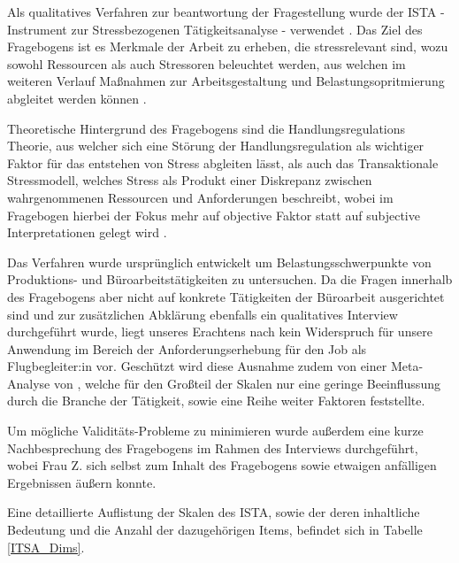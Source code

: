 \documentclass[12pt, a4paper]{article}
\begin{document}
Als qualitatives Verfahren zur beantwortung der Fragestellung wurde der ISTA - Instrument zur Stressbezogenen Tätigkeitsanalyse - verwendet 
\parencite{semmerISTAInstrumentZur1998}. 
Das Ziel des Fragebogens ist es Merkmale der Arbeit zu erheben, die stressrelevant sind,
wozu sowohl Ressourcen als auch Stressoren beleuchtet werden, aus welchen im weiteren Verlauf 
Maßnahmen zur Arbeitsgestaltung und Belastungsopritmierung abgleitet werden können \parencite{semmerInstrumentZurStressbezogenen1999}. 

Theoretische Hintergrund des Fragebogens sind die Handlungsregulations Theorie, aus welcher sich eine Störung der Handlungsregulation
als wichtiger Faktor für das entstehen von Stress abgleiten lässt, als auch das Transaktionale Stressmodell, 
welches Stress als Produkt einer Diskrepanz zwischen wahrgenommenen Ressourcen und Anforderungen beschreibt, 
wobei im Fragebogen hierbei der Fokus mehr auf objective Faktor statt auf subjective Interpretationen gelegt wird 
\parencite{semmerInstrumentZurStressbezogenen1999}.

Das Verfahren wurde ursprünglich entwickelt um Belastungsschwerpunkte von Produktions- und Büroarbeitstätigkeiten zu untersuchen. 
Da die Fragen innerhalb des Fragebogens aber nicht auf konkrete Tätigkeiten der Büroarbeit
ausgerichtet sind und zur zusätzlichen Abklärung ebenfalls ein qualitatives Interview durchgeführt wurde, 
liegt unseres Erachtens nach kein Widerspruch für unsere Anwendung im
Bereich der Anforderungserhebung für den Job als Flugbegleiter:in vor. 
Geschützt wird diese Ausnahme zudem von einer Meta-Analyse von \textcite{irmerInstrumentStressOrientedTask2019}, welche für den Großteil der 
Skalen nur eine geringe Beeinflussung durch die Branche der Tätigkeit, sowie eine Reihe weiter Faktoren feststellte.
 
Um mögliche Validitäts-Probleme zu minimieren wurde außerdem eine kurze Nachbesprechung des Fragebogens im Rahmen des Interviews durchgeführt, 
wobei Frau Z. sich selbst zum Inhalt des Fragebogens sowie etwaigen anfälligen Ergebnissen äußern konnte. 

Eine detaillierte Auflistung der Skalen des ISTA, sowie der deren inhaltliche Bedeutung und die Anzahl der dazugehörigen Items, 
befindet sich in Tabelle \ref{ITSA_Dims}.
\end{document}

